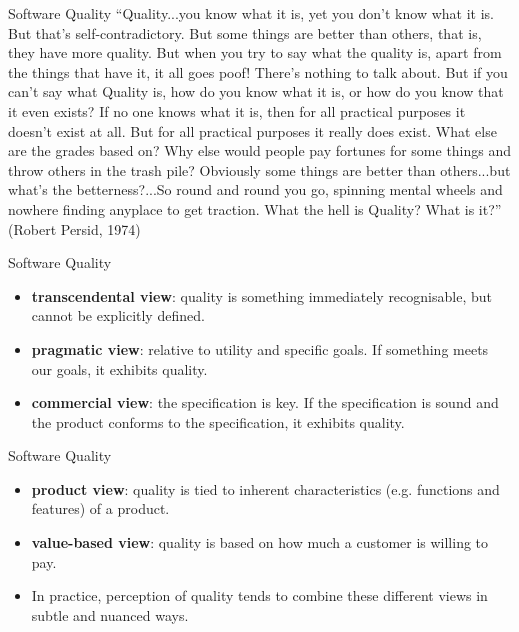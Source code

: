 \begin{frame}[fragile]{Software Quality}
	``Quality...you know what it is, yet you don't know what it is. But that's self-contradictory. But some things are better than 
	others, that is, they have more quality. But when you try to say what the quality is, apart from the things that have it, it all 
	goes poof! There's nothing to talk about. But if you can't say what Quality is, how do you know what it is, or how do you know 
	that it even exists? If no one knows what it is, then for all practical purposes it doesn't exist at all. But for all practical purposes 
	it really does exist. What else are the grades based on? Why else would people pay fortunes for some things and throw others
	 in the trash pile? Obviously some things are better than others...but what's the betterness?...So round and round you go, 
	 spinning mental wheels and nowhere finding anyplace to get traction. What the hell is Quality? What is it?''
	\vspace{2ex}
	(Robert Persid, 1974)
\end{frame}

\begin{frame}[fragile]{Software Quality}
	\begin{itemize}
		\item \textbf{transcendental view}: quality is something immediately recognisable, but cannot be explicitly defined. \pause
		\item \textbf{pragmatic view}: relative to utility and specific goals. If something meets our goals, it exhibits quality.  \pause
		\item \textbf{commercial view}: the specification is key. If the specification is sound and the product conforms to the
		specification, it exhibits quality. 
	\end{itemize}
\end{frame}

\begin{frame}[fragile]{Software Quality}
	\begin{itemize}
		\item \textbf{product view}: quality is tied to inherent characteristics (e.g. functions and features) of a product.  \pause
		\item \textbf{value-based view}: quality is based on how much a customer is willing to pay.  \pause
		\item In practice, perception of quality tends to combine these different views in subtle and nuanced ways.
	\end{itemize}
\end{frame}

